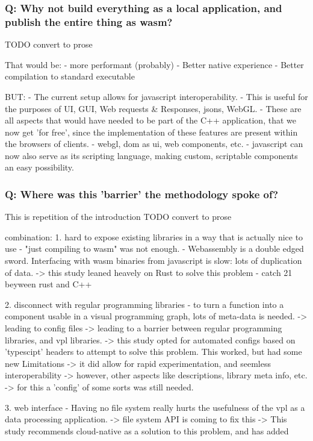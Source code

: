 \subsubsection*{Q: Why not build everything as a local application, and publish the entire thing as wasm?}

\begin{note}

  TODO convert to prose 

  That would be:
  - more performant (probably)
  - Better native experience
  - Better compilation to standard executable
  
  BUT:
  - The current setup allows for javascript interoperability. 
    - This is useful for the purposes of UI, GUI, Web requests \& Responses, jsons, WebGL.
    - These are all aspects that would have needed to be part of the C++ application, that we now get 'for free', since the implementation of these features are present within the browsers of clients. 
      - webgl, dom as ui, web components, etc.
  - javascript can now also serve as its scripting language, making custom, scriptable components an easy possibility.
  
\end{note}


\subsubsection*{Q: Where was this 'barrier' the methodology spoke of?}

\begin{note}

  This is repetition of the introduction
  TODO convert to prose

  combination: 
  1. hard to expose existing libraries in a way that is actually nice to use
  - "just compiling to wasm" was not enough.
  - Webassembly is a double edged sword. Interfacing with wasm binaries from javascript is slow: lots of duplication of data. 
  -> this study leaned heavely on Rust to solve this problem
  - catch 21 beyween rust and C++
  
  2. disconnect with regular programming libraries
  - to turn a function into a component usable in a visual programming graph, lots of meta-data is needed. 
    -> leading to config files 
    -> leading to a barrier between regular programming libraries, and vpl libraries. 
    -> this study opted for automated configs based on 'typescipt' headers to attempt to solve this problem. This worked, but had some new Limitations
       -> it did allow for rapid experimentation, and seemless interoperability
       -> however, other aspects like descriptions, library meta info, etc. 
       -> for this a 'config' of some sorts was still needed. 
  
  3. web interface
  - Having no file system really hurts the usefulness of the vpl as a data processing application.
  -> file system API is coming to fix this
  -> This study recommends cloud-native as a solution to this problem, and has added 
  
\end{note}

